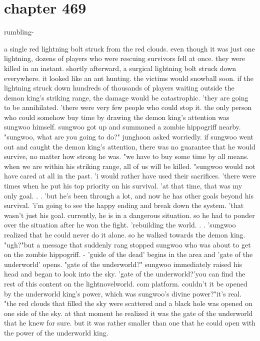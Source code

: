 \section{chapter 469}

rumbling-




a single red lightning bolt struck from the red clouds.
 even though it was just one lightning, dozens of players who were rescuing survivors fell at once.
 they were killed in an instant.
 shortly afterward, a surgical lightning bolt struck down everywhere.
 it looked like an ant hunting.
the victims would snowball soon.
 if the lightning struck down hundreds of thousands of players waiting outside the demon king's striking range, the damage would be catastrophic.
'they are going to be annihilated.
'there were very few people who could stop it.
 the only person who could somehow buy time by drawing the demon king's attention was sungwoo himself.
sungwoo got up and summoned a zombie hippogriff nearby.
"sungwoo, what are you going to do?" junghoon asked worriedly.
if sungwoo went out and caught the demon king's attention, there was no guarantee that he would survive, no matter how strong he was.
 "we have to buy some time by all means.
 when we are within his striking range, all of us will be killed.
"sungwoo would not have cared at all in the past.
 'i would rather have used their sacrifices.
'there were times when he put his top priority on his survival.
'at that time, that was my only goal.
.
.
'but he's been through a lot, and now he has other goals beyond his survival.
'i'm going to see the happy ending and break down the system.
'that wasn't just his goal.
 currently, he is in a dangerous situation.
 so he had to ponder over the situation after he won the fight.
'rebuilding the world.
.
.
'sungwoo realized that he could never do it alone.
 so he walked towards the demon king.
"ugh?"but a message that suddenly rang stopped sungwoo who was about to get on the zombie hippogriff.
- 'guide of the dead' begins in the area and 'gate of the underworld' opens.
"gate of the underworld?"
sungwoo immediately raised his head and began to look into the sky.
'gate of the underworld?'you can find the rest of this content on the lightnovelworld.
com platform.
couldn't it be opened by the underworld king's power, which was sungwoo's divine power?"it's real.
"the red clouds that filled the sky were scattered and a black hole was opened on one side of the sky.
at that moment he realized it was the gate of the underworld that he knew for sure.
but it was rather smaller than one that he could open with the power of the underworld king.
